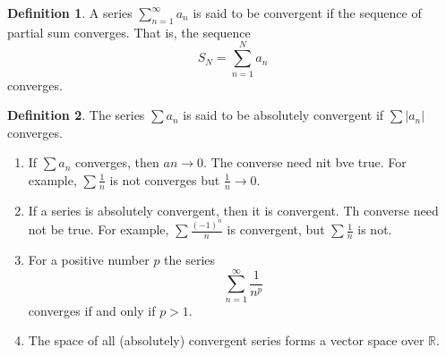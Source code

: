 \documentclass{article}
\theoremstyle{definition}
\newtheorem{definition}{Definition}
\begin{document}
    \begin{definition}
        A series $\sum_{n=1} ^\infty a_n$ is said to be convergent if the sequence of partial sum converges. That is, the sequence 
        \[
            S_N = \sum_{n=1}^N a_n
        \]
        converges. 
    \end{definition}
    \begin{definition}
        The series $\sum a_n$ is said to be absolutely convergent if $\sum \vert a_n \vert $ converges.
    \end{definition}
    \begin{enumerate}
        \item If $\sum a_n$ converges, then $an \to  0$. The converse need nit bve true. For example, $\sum \frac{1}{n}$ is not converges but $\frac{1}{n}\to 0$. 
        \item If a series is absolutely convergent, then it is convergent. Th converse need not be true. For example, $\sum \frac{(-1)^n}{n} $ is convergent, but $\sum \frac{1}{n}$ is not. 
        \item For a positive number $p$ the series 
        \[
            \sum_{n=1}^\infty \frac{1}{n^p}
        \]
        converges if and only if $p>1$.
        \item The space of all (absolutely) convergent series forms a vector space over $\mathbb{R} $. 
    \end{enumerate}
\end{document}
